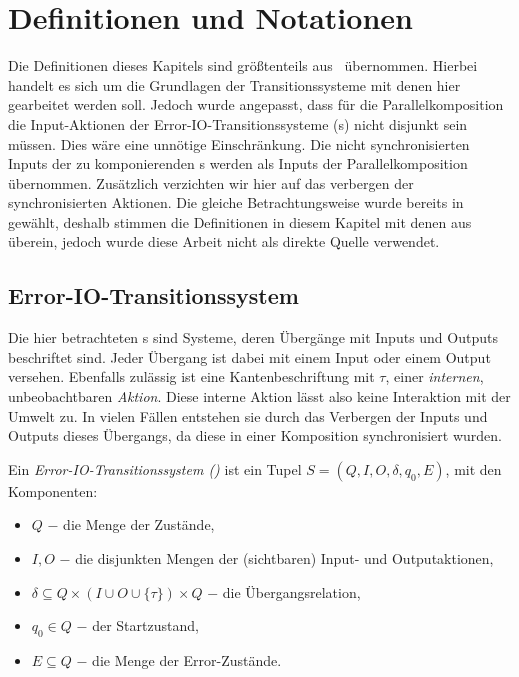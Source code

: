 \chapter{Definitionen und Notationen}

Die Definitionen dieses Kapitels sind größtenteils aus~\cite{Vogler2014EIO}
übernommen. Hierbei handelt es sich um die Grundlagen der Transitionssysteme mit denen
hier gearbeitet werden soll. Jedoch wurde angepasst, dass für die
Parallelkomposition die Input-Aktionen der Error-IO-Transitionssysteme
(\EIO{}s) nicht disjunkt sein müssen. Dies wäre eine unnötige Einschränkung.
Die nicht synchronisierten Inputs der zu komponierenden \EIO{}s werden als
Inputs der Parallelkomposition übernommen. Zusätzlich verzichten wir hier auf
das verbergen der synchronisierten Aktionen. Die gleiche Betrachtungsweise
wurde bereits in~\cite{Schlosser2012BA} gewählt, deshalb stimmen die
Definitionen in diesem Kapitel mit denen aus~\cite{Schlosser2012BA} überein,
jedoch wurde diese Arbeit nicht als direkte Quelle verwendet.

\section{Error-IO-Transitionssystem}
Die hier betrachteten \EIO{}s sind Systeme, deren Übergänge mit Inputs und Outputs
beschriftet sind. Jeder Übergang ist dabei mit einem Input oder einem Output
versehen. Ebenfalls zulässig ist eine Kantenbeschriftung mit $\tau$, einer
\emph{internen}, unbeobachtbaren \emph{Aktion}. Diese interne
Aktion lässt also keine Interaktion mit
der Umwelt zu. In vielen Fällen entstehen sie durch das Verbergen der Inputs und Outputs
dieses Übergangs, da diese in einer Komposition synchronisiert
wurden.

\begin{Def}
  Ein \emph{Error-IO-Transitionssystem \linebreak (\EIO{})} ist
  ein Tupel $S=(Q,I,O,\delta, q_0, E)$, mit den Komponenten:
  \begin{itemize}
    \item $Q$ $-$ die Menge der Zustände,
    \item $I,O$ $-$ die disjunkten Mengen der (sichtbaren) Input- und
      Outputaktionen,
    \item $\delta\subseteq Q\times (I\cup O\cup\{\tau\})\times Q$ $-$ die
      Übergangsrelation,
    \item $q_0\in Q$ $-$ der Startzustand,
    \item $E\subseteq Q$ $-$ die Menge der Error-Zustände.
  \end{itemize}
\end{Def}

